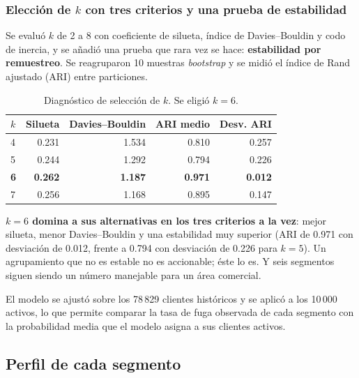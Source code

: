 \documentclass[11pt,a4paper]{article}
\newcommand{\T}[1]{}
\begin{document}
\subsubsection*{Elección de $k$ con tres criterios y una prueba de estabilidad}

Se evaluó $k$ de 2 a 8 con coeficiente de silueta, índice de Davies--Bouldin y
codo de inercia, y se añadió una prueba que rara vez se hace: \textbf{estabilidad
por remuestreo}. Se reagruparon 10 muestras \emph{bootstrap} y se midió el índice
de Rand ajustado (ARI) entre particiones.

\begin{table}[H]\centering\small
\begin{tabular}{@{}lrrrr@{}}
\toprule
\textbf{$k$} & \textbf{Silueta} & \textbf{Davies--Bouldin} & \textbf{ARI medio} & \textbf{Desv. ARI} \\
\midrule
4 & 0.231 & 1.534 & 0.810 & 0.257 \\
5 & 0.244 & 1.292 & 0.794 & 0.226 \\
\textbf{6} & \textbf{0.262} & \textbf{1.187} & \textbf{0.971} & \textbf{0.012} \\
7 & 0.256 & 1.168 & 0.895 & 0.147 \\
\bottomrule
\end{tabular}
\caption{Diagnóstico de selección de $k$. Se eligió $k=6$.}
\end{table}

\noindent \textbf{$k=6$ domina a sus alternativas en los tres criterios a la vez}:
mejor silueta, menor Davies--Bouldin y una estabilidad muy superior (ARI de 0.971
con desviación de 0.012, frente a 0.794 con desviación de 0.226 para $k=5$). Un
agrupamiento que no es estable no es accionable; éste lo es. Y seis segmentos
siguen siendo un número manejable para un área comercial.

El modelo se ajustó sobre los 78\,829 clientes históricos y se aplicó a los
10\,000 activos, lo que permite comparar la tasa de fuga observada de cada
segmento con la probabilidad media que el modelo asigna a sus clientes activos.

\subsection{Perfil de cada segmento}

\begin{table}[H]\centering\small
\caption{Los seis segmentos, ordenados por tasa de fuga histórica observada.}
\T{clusters}
\end{table}
\end{document}
